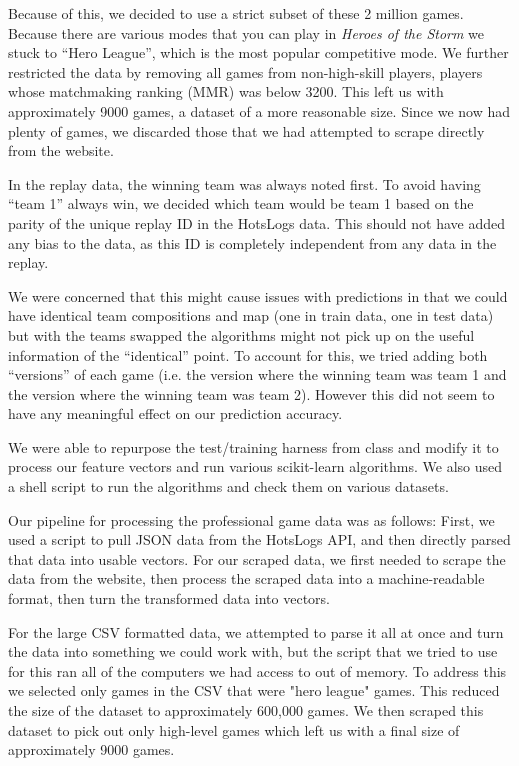 \documentclass[11pt,letterpaper]{article}
\begin{document}
Because of this, we decided to use a strict subset of these 2 million games. Because there are various modes that you can play in \textit{Heroes of the Storm} we stuck to ``Hero League'', which is the most popular competitive mode. We further restricted the data by removing all games from non-high-skill players, players whose matchmaking ranking (MMR) was below 3200. This left us with approximately 9000 games, a dataset of a more reasonable size. Since we now had plenty of games, we discarded those that we had attempted to scrape directly from the website.

In the replay data, the winning team was always noted first. To avoid having ``team 1'' always win, we decided which team would be team 1 based on the parity of the unique replay ID in the HotsLogs data. This should not have added any bias to the data, as this ID is completely independent from any data in the replay.

We were concerned that this might cause issues with predictions in that we could have identical team compositions and map (one in train data, one in test data) but with the teams swapped the algorithms might not pick up on the useful information of the ``identical'' point. To account for this, we tried adding both ``versions'' of each game (i.e. the version where the winning team was team 1 and the version where the winning team was team 2). However this did not seem to have any meaningful effect on our prediction accuracy.

We were able to repurpose the test/training harness from class and modify it to process our feature vectors and run various scikit-learn algorithms. We also used a shell script to run the algorithms and check them on various datasets. 

Our pipeline for processing the professional game data was as follows: First, we used a script to pull JSON data from the HotsLogs API, and then directly parsed that data into usable vectors. For our scraped data, we first needed to scrape the data from the website, then process the scraped data into a machine-readable format, then turn the transformed data into vectors. 

For the large CSV formatted data, we attempted to parse it all at once and turn the data into something we could work with, but the script that we tried to use for this ran all of the computers we had access to out of memory. To address this we selected only games in the CSV that were "hero league" games. This reduced the size of the dataset to approximately 600,000 games. We then scraped this dataset to pick out only high-level games which left us with a final size of approximately 9000 games. 
\end{document}
